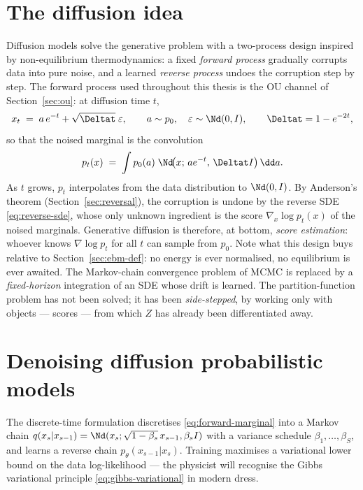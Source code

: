 \section{The diffusion idea}\label{sec:diffusion-idea}

Diffusion models \citep{sohl2015deep, ho2020denoising, song2021scorebased}
solve the generative problem with a two-process design inspired by
non-equilibrium thermodynamics: a fixed \emph{forward process} gradually
corrupts data into pure noise, and a learned \emph{reverse process} undoes
the corruption step by step. The forward process used throughout this
thesis is the OU channel of Section~\ref{sec:ou}: at diffusion time $t$,
\begin{equation}
  x_t \;=\; a\, e^{-t} + \sqrt{\Deltat}\;\varepsilon,
  \qquad a \sim p_0,\quad \varepsilon \sim \Nd(0, I),
  \qquad \Deltat = 1 - e^{-2t},
  \label{eq:forward-marginal}
\end{equation}
so that the noised marginal is the convolution
\begin{equation}
  p_t(x) \;=\; \int p_0(a)\; \Nd\!\big(x;\, a e^{-t},\, \Deltat I\big)\,
  \dd a .
  \label{eq:pt-convolution}
\end{equation}
As $t$ grows, $p_t$ interpolates from the data distribution to
$\Nd(0, I)$. By Anderson's theorem (Section~\ref{sec:reversal}), the
corruption is undone by the reverse SDE \eqref{eq:reverse-sde}, whose only
unknown ingredient is the score $\nabla_x \log p_t(x)$ of the noised
marginals. Generative diffusion is therefore, at bottom, \emph{score
estimation}: whoever knows $\nabla \log p_t$ for all $t$ can sample from
$p_0$. Note what this design buys relative to Section~\ref{sec:ebm-def}: no
energy is ever normalised, no equilibrium is ever awaited. The Markov-chain
convergence problem of MCMC is replaced by a \emph{fixed-horizon} integration
of an SDE whose drift is learned. The partition-function problem has not
been solved; it has been \emph{side-stepped}, by working only with objects
--- scores --- from which $Z$ has already been differentiated away.

\section{Denoising diffusion probabilistic models}\label{sec:ddpm}

The discrete-time formulation \citep{sohl2015deep, ho2020denoising}
discretises \eqref{eq:forward-marginal} into a Markov chain
$q(x_s | x_{s-1}) = \Nd(x_s; \sqrt{1 - \beta_s}\, x_{s-1}, \beta_s I)$ with
a variance schedule $\beta_1, \dots, \beta_S$, and learns a reverse chain
$p_\theta(x_{s-1} | x_s)$. Training maximises a variational lower bound on
the data log-likelihood --- the physicist will recognise the Gibbs
variational principle \eqref{eq:gibbs-variational} in modern dress.

